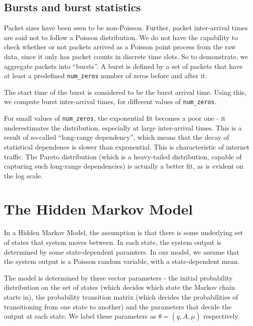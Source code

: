 \documentclass[11pt, twoside]{article}
\begin{document}
\subsection{Bursts and burst statistics}

Packet sizes have been seen to be non-Poisson. Further, packet inter-arrival times are said not to follow a Poisson distribution. We do not have the capability to check whether or not packets arrived as a Poisson point process from the raw data, since it only has packet counts in discrete time slots. So to demonstrate, we aggregate packets into ``bursts''. A burst is defined by a set of packets that have at least a predefined \verb+num_zeros+ number of zeros before and after it.

The start time of the burst is considered to be the burst arrival time. Using this, we compute burst inter-arrival times, for different values of \verb+num_zeros+.

For small values of \verb+num_zeros+, the exponential fit becomes a poor one - it underestimates the distribution, especially at large inter-arrival times. This is a result of so-called ``long-range dependency'', which means that the decay of statistical dependence is slower than exponential. This is characteristic of internet traffic. The Pareto distribution (which is a heavy-tailed distribution, capable of capturing such long-range dependencies) is actually a better fit, as is evident on the log scale.

\section{The Hidden Markov Model}

In a Hidden Markov Model, the assumption is that there is some underlying set of states that system moves between. In each state, the system output is determined by some state-dependent paramters. In our model, we assume that the system output is a Poisson random variable, with a state-dependent mean.

The model is determined by three vector parameters - the initial probability distribution on the set of states (which decides which state the Markov chain starts in), the probability transition matrix (which decides the probabilities of transitioning from one state to another) and the parameters that decide the output at each state. We label these parameters as $\theta = (\underline{q}, A, \underline{\mu})$ respectively.
\end{document}
